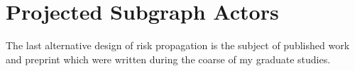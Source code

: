 \section{Projected Subgraph Actors}\label{sec:projected-subgraphs}

The last alternative design of risk propagation is the subject of published work \citep{Tatton2022b} and preprint \citep{Tatton2022a} which were written during the coarse of my graduate studies.








